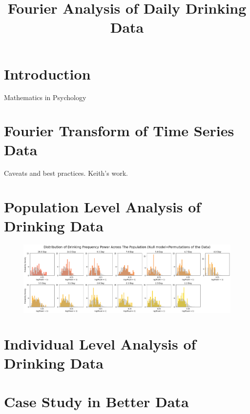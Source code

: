 \documentclass{journal}
\theoremstyle{definition}
\begin{document}
\title{Fourier Analysis of Daily Drinking Data}
\maketitle
\section{Introduction}
Mathematics in Psychology

\section{Fourier Transform of Time Series Data}
Caveats and best practices. Keith's work.

\section{Population Level Analysis of Drinking Data}
\begin{figure}[h]
\includegraphics[width=\textwidth]{permutation_null_drinking_ft}
\end{figure}
\section{Individual Level Analysis of Drinking Data}

\section{Case Study in Better Data}
\end{document}
